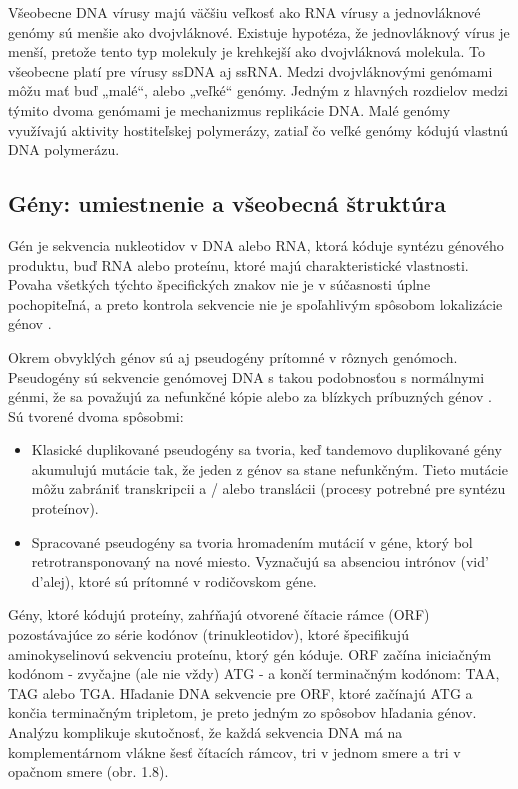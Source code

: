 Všeobecne DNA vírusy majú väčšiu veľkosť ako RNA vírusy a jednovláknové genómy sú menšie ako dvojvláknové.
Existuje hypotéza, že jednovláknový vírus je menší, pretože tento typ molekuly je krehkejší ako dvojvláknová molekula.
To všeobecne platí pre vírusy ssDNA aj ssRNA.
Medzi dvojvláknovými genómami môžu mať buď „malé“, alebo „veľké“ genómy.
Jedným z hlavných rozdielov medzi týmito dvoma genómami je mechanizmus replikácie DNA.
Malé genómy využívajú aktivity hostiteľskej polymerázy, zatiaľ čo veľké genómy kódujú vlastnú DNA polymerázu.

\subsection{Gény: umiestnenie a všeobecná štruktúra}
Gén je sekvencia nukleotidov v DNA alebo RNA, ktorá kóduje syntézu génového produktu, buď RNA alebo proteínu, ktoré majú charakteristické vlastnosti.
Povaha všetkých týchto špecifických znakov nie je v súčasnosti úplne pochopiteľná, a preto kontrola sekvencie nie je spoľahlivým spôsobom lokalizácie génov \cite{Genomes3}.

Okrem obvyklých génov sú aj pseudogény prítomné v rôznych genómoch.
Pseudogény sú sekvencie genómovej DNA s takou podobnosťou s normálnymi génmi, že sa považujú za nefunkčné kópie alebo za blízkych príbuzných génov \cite{PrinciplesOfGeneManipulation}. 
Sú tvorené dvoma spôsobmi:
\begin{itemize}
	\item Klasické duplikované pseudogény sa tvoria, keď tandemovo duplikované gény akumulujú mutácie tak, že jeden z génov sa stane nefunkčným.
	Tieto mutácie môžu zabrániť transkripcii a / alebo translácii (procesy potrebné pre syntézu proteínov).
	\item Spracované pseudogény sa tvoria hromadením mutácií v géne, ktorý bol retrotransponovaný na nové miesto.
	Vyznačujú sa absenciou intrónov (vid' d'alej), ktoré sú prítomné v rodičovskom géne.
\end{itemize} 

Gény, ktoré kódujú proteíny, zahŕňajú otvorené čítacie rámce (ORF) pozostávajúce zo série kodónov (trinukleotidov), ktoré špecifikujú aminokyselinovú sekvenciu proteínu, ktorý gén kóduje.
ORF začína iniciačným kodónom - zvyčajne (ale nie vždy) ATG - a končí terminačným kodónom: TAA, TAG alebo TGA.
Hľadanie DNA sekvencie pre ORF, ktoré začínajú ATG a končia terminačným tripletom, je preto jedným zo spôsobov hľadania génov.
Analýzu komplikuje skutočnosť, že každá sekvencia DNA má na komplementárnom vlákne šesť čítacích rámcov, tri v jednom smere a tri v opačnom smere (obr. 1.8).

